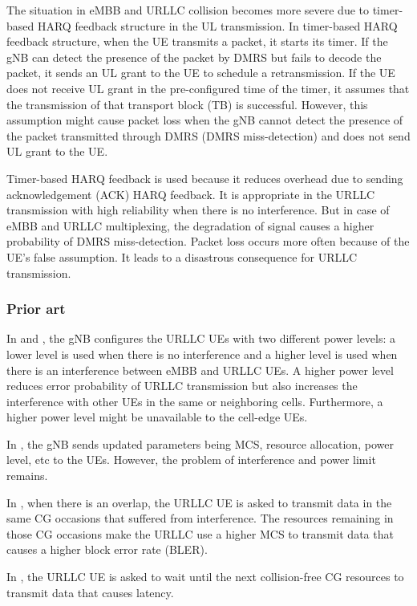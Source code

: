 \documentclass{ieeeaccess}
\begin{document}
The situation in eMBB and URLLC collision becomes more severe due to timer-based HARQ feedback structure in the UL transmission. In timer-based HARQ feedback structure, when the UE transmits a packet, it starts its timer. If the gNB can detect the presence of the packet by DMRS but fails to decode the packet, it sends an UL grant to the UE to schedule a retransmission. If the UE does not receive UL grant in the pre-configured time of the timer, it assumes that the transmission of that transport block (TB) is successful. However, this assumption might cause packet loss when the gNB cannot detect the presence of the packet transmitted through DMRS (DMRS miss-detection) and does not send UL grant to the UE. 

Timer-based HARQ feedback is used because it reduces overhead due to sending acknowledgement (ACK) HARQ feedback. It is appropriate in the URLLC transmission with high reliability when there is no interference. But in case of eMBB and URLLC multiplexing, the degradation of signal causes a higher probability of DMRS miss-detection. Packet loss occurs more often because of the UE's false assumption. It leads to a disastrous consequence for URLLC transmission.

\subsubsection{Prior art} \label{IIBN}

In \cite{ref13} and \cite {ref14}, the gNB configures the URLLC UEs with two different power levels: a lower level is used when there is no interference and a higher level is used when there is an interference between eMBB and URLLC UEs. A higher power level reduces error probability of URLLC transmission but also increases the interference with other UEs in the same or neighboring cells. Furthermore, a higher power level might be unavailable to the cell-edge UEs.

In \cite{ref15}, the gNB sends updated parameters being MCS, resource allocation, power level, etc to the UEs. However, the problem of interference and power limit remains.

In \cite{ref16}, when there is an overlap, the URLLC UE is asked to transmit data in the same CG occasions that suffered from interference. The resources remaining in those CG occasions make the URLLC use a higher MCS to transmit data that causes a higher block error rate (BLER).

In \cite{ref17}, the URLLC UE is asked to wait until the next collision-free CG resources to transmit data that causes latency.
\end{document}

